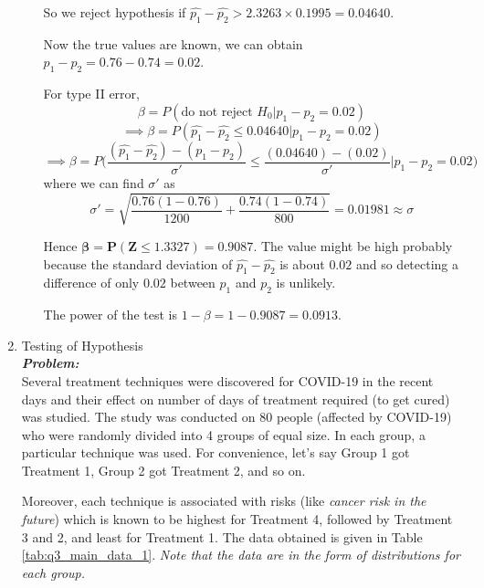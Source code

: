 \documentclass[12pt, oneside]{article}
\begin{document}
\begin{enumerate}
\begin{enumerate}
    So we reject hypothesis if $\hat{p_1} - \hat{p_2} > 2.3263 \times 0.1995 =  0.04640$.
    
    Now the true values are known, we can obtain $p_1 - p_2 = 0.76 - 0.74 = 0.02$.
    
    For type II error, 
    \[ \beta = P(\text{do not reject }H_0 | p_1-p_2 =0.02) \]
    \[ \implies \beta = P(\hat{p_1} - \hat{p_2} \le 0.04640 | p_1-p_2 =0.02) \]
    \[ \implies \beta = P \bigg( \frac{(\hat{p_1} - \hat{p_2}) - (p_1-p_2)}{\sigma'} \le \frac{( 0.04640) - (0.02)}{\sigma'} | p_1-p_2 =0.02 \bigg) \]
    where we can find $\sigma'$ as
    \[  \sigma' = \sqrt{ \frac{0.76(1-0.76)}{1200} + \frac{0.74(1-0.74)}{800} } = 0.01981  \approx \sigma \]
    
    Hence  $\mathbf{\beta = P(Z \le 1.3327) = 0.9087}$. The value might be high probably because the standard deviation of $\hat{p_1} - \hat{p_2}$ is about $0.02$ and so detecting a difference of only $0.02$ between $p_1$ and $p_2$ is unlikely.
    
    The power of the test is $1-\beta = 1-0.9087 = 0.0913$.
    
\end{enumerate}



\item	 Testing of Hypothesis \\
\textit{\textbf{Problem:}} \\

Several treatment techniques were discovered for COVID-19 in the recent days and their effect on number of days of treatment required (to get cured) was studied. The study was conducted on 80 people (affected by COVID-19) who were randomly divided into 4 groups of equal size. In each group, a particular technique was used. For convenience, let's say Group 1 got Treatment 1, Group 2 got Treatment 2, and so on. 

Moreover, each technique is associated with risks (like \textit{cancer risk in the future}) which is known to be highest for Treatment 4, followed by Treatment 3 and 2, and least for Treatment 1.
The data obtained is given in Table \ref{tab:q3_main_data_1}. \textit{Note that the data are in the form of distributions for each group.}



\end{enumerate}
\end{document}
